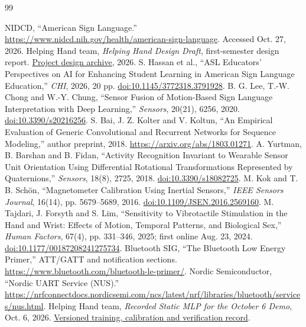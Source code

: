 \documentclass[11pt,letterpaper]{article}
\begin{document}
\clearpage
\begin{thebibliography}{99}
\small
\raggedright
\setlength{\itemsep}{3pt}
 NIDCD, ``American Sign Language.'' \url{https://www.nidcd.nih.gov/health/american-sign-language}. Accessed Oct. 27, 2026.
 Helping Hand team, \emph{Helping Hand Design Draft}, first-semester design report. \href{https://github.com/GG1627/helping-hand/blob/a35d0f5/design_draft/Helping_Hand_Design_Draft.pdf}{Project design archive}, 2026.
 S. Hassan et al., ``ASL Educators' Perspectives on AI for Enhancing Student Learning in American Sign Language Education,'' \emph{CHI}, 2026, 20 pp. \href{https://doi.org/10.1145/3772318.3791928}{doi:10.1145/3772318.3791928}.
 B. G. Lee, T.-W. Chong and W.-Y. Chung, ``Sensor Fusion of Motion-Based Sign Language Interpretation with Deep Learning,'' \emph{Sensors}, 20(21), 6256, 2020. \href{https://doi.org/10.3390/s20216256}{doi:10.3390/s20216256}.
 S. Bai, J. Z. Kolter and V. Koltun, ``An Empirical Evaluation of Generic Convolutional and Recurrent Networks for Sequence Modeling,'' author preprint, 2018. \url{https://arxiv.org/abs/1803.01271}.
 A. Yurtman, B. Barshan and B. Fidan, ``Activity Recognition Invariant to Wearable Sensor Unit Orientation Using Differential Rotational Transformations Represented by Quaternions,'' \emph{Sensors}, 18(8), 2725, 2018. \href{https://doi.org/10.3390/s18082725}{doi:10.3390/s18082725}.
 M. Kok and T. B. Sch\"on, ``Magnetometer Calibration Using Inertial Sensors,'' \emph{IEEE Sensors Journal}, 16(14), pp. 5679--5689, 2016. \href{https://doi.org/10.1109/JSEN.2016.2569160}{doi:10.1109/JSEN.2016.2569160}.
 M. Tajdari, J. Forsyth and S. Lim, ``Sensitivity to Vibrotactile Stimulation in the Hand and Wrist: Effects of Motion, Temporal Patterns, and Biological Sex,'' \emph{Human Factors}, 67(4), pp. 331--346, 2025; first online Aug. 23, 2024. \href{https://doi.org/10.1177/00187208241275734}{doi:10.1177/00187208241275734}.
 Bluetooth SIG, ``The Bluetooth Low Energy Primer,'' ATT/GATT and notification sections. \url{https://www.bluetooth.com/bluetooth-le-primer/}.
 Nordic Semiconductor, ``Nordic UART Service (NUS).'' \url{https://nrfconnectdocs.nordicsemi.com/ncs/latest/nrf/libraries/bluetooth/services/nus.html}.
 Helping Hand team, \emph{Recorded Static MLP for the October 6 Demo}, Oct. 6, 2026. \href{https://github.com/GG1627/helping-hand/blob/a35d0f5/docs/STATIC_MLP_DEMO_MODEL.md}{Versioned training, calibration and verification record}.

\end{thebibliography}
\end{document}
